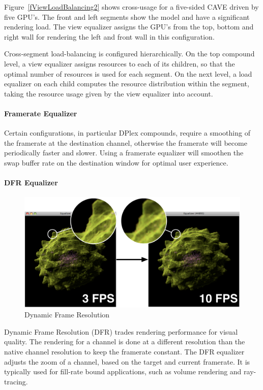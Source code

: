 \documentclass[10pt,a4]{scrartcl}
\newcommand{\fig}[1]{Figure~\ref{#1}}
\begin{document}
\fig{fViewLoadBalancing2} shows cross-usage for a five-sided CAVE driven
by five GPU's. The front and left segments show the model and have a
significant rendering load. The view equalizer assigns the GPU's from
the top, bottom and right wall for rendering the left and front wall in
this configuration.

Cross-segment load-balan\-cing is configured hierarchically. On the top
compound level, a view equalizer assigns resources to each of its
children, so that the optimal number of resources is used for each
segment. On the next level, a load equalizer on each child computes the
resource distribution within the segment, taking the resource usage
given by the view equalizer into account.

\paragraph{Framerate Equalizer}
Certain configurations, in particular DPlex compounds, require a
smoothing of the framerate at the destination channel, otherwise the
framerate will become periodically faster and slower. Using a framerate
equalizer will smoothen the swap buffer rate on the destination window
for optimal user experience.

\paragraph{DFR Equalizer}

\begin{figure}
  \includegraphics[width=.618\textwidth]{images/dfr.pdf}
  {\caption{\label{fDFR}Dynamic Frame Resolution}}
\end{figure}
Dynamic Frame Resolution (DFR) trades rendering performance for visual
quality. The rendering for a channel is done at a different resolution
than the native channel resolution to keep the framerate constant. The
DFR equalizer adjusts the zoom of a channel, based on the target and
current framerate. It is typically used for fill-rate bound
applications, such as volume rendering and ray-tracing.
\end{document}
